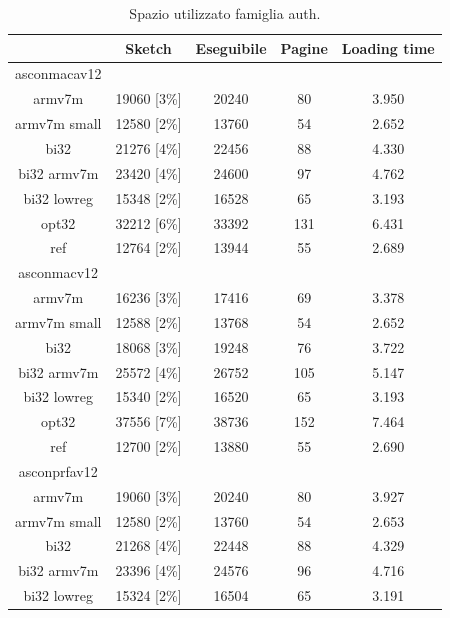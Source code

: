 \documentclass[12pt,a4paper,italian]{report}
\begin{document}
\begin{table}[h]
    \caption{Spazio utilizzato famiglia auth.}
    \centering
	\begin{tabular}{|c|c|c|c|c|}
		\hline
         & Sketch & Eseguibile & Pagine & Loading time \\
        \hline
        asconmacav12 & & & & \\
        \hline
        armv7m & 19060 [3\%] & 20240 & 80 & 3.950 \\
        \hline
        armv7m small & 12580 [2\%] & 13760 & 54 & 2.652 \\
        \hline
        bi32 & 21276 [4\%] & 22456 & 88 & 4.330 \\
        \hline
        bi32 armv7m & 23420 [4\%] & 24600 & 97 & 4.762 \\
        \hline
        bi32 lowreg & 15348 [2\%] & 16528 & 65 & 3.193 \\
        \hline
        opt32 & 32212 [6\%] & 33392 & 131 & 6.431 \\
        \hline
        ref & 12764 [2\%] & 13944 & 55 & 2.689 \\
        \hline
        asconmacv12 & & & & \\
        \hline
        armv7m & 16236 [3\%] & 17416 & 69 & 3.378 \\
        \hline
        armv7m small & 12588 [2\%] & 13768 & 54 & 2.652 \\
        \hline
        bi32 & 18068 [3\%] & 19248 & 76 & 3.722 \\
        \hline
        bi32 armv7m & 25572 [4\%] & 26752 & 105 & 5.147 \\
        \hline
        bi32 lowreg & 15340 [2\%] & 16520 & 65 & 3.193 \\
        \hline
        opt32 & 37556 [7\%] & 38736 & 152 & 7.464 \\
        \hline
        ref & 12700 [2\%] & 13880 & 55 & 2.690 \\
        \hline
        asconprfav12 & & & & \\
        \hline
        armv7m & 19060 [3\%] & 20240 & 80 & 3.927 \\
        \hline
        armv7m small & 12580 [2\%] & 13760 & 54 & 2.653 \\
        \hline
        bi32 & 21268 [4\%] & 22448 & 88 & 4.329 \\
        \hline
        bi32 armv7m & 23396 [4\%] & 24576 & 96 & 4.716 \\
        \hline
        bi32 lowreg & 15324 [2\%] & 16504 & 65 & 3.191 \\

\end{tabular}
\end{table}
\end{document}
